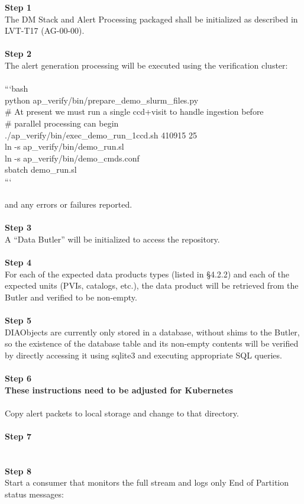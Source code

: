 \textbf{Step 1}\\
The DM Stack and Alert Processing packaged shall be initialized as
described in LVT-T17 (AG-00-00).\\
~\\
\textbf{Step 2}\\
The alert generation processing will be executed using the verification
cluster:\\
~\\
```bash\\
python ap\_verify/bin/prepare\_demo\_slurm\_files.py\\
\# At present we must run a single ccd+visit to handle ingestion
before\\
\# parallel processing can begin\\
./ap\_verify/bin/exec\_demo\_run\_1ccd.sh 410915 25\\
ln -s ap\_verify/bin/demo\_run.sl\\
ln -s ap\_verify/bin/demo\_cmds.conf\\
sbatch demo\_run.sl\\
```\\
~\\
and any errors or failures reported.\\
~\\
\textbf{Step 3}\\
A ``Data Butler'' will be initialized to access the repository.\\
~\\
\textbf{Step 4}\\
For each of the expected data products types (listed in §4.2.2) and each
of the expected units (PVIs, catalogs, etc.), the data product will be
retrieved from the Butler and verified to be non-empty.\\
~\\
\textbf{Step 5}\\
DIAObjects are currently only stored in a database, without shims to the
Butler, so the existence of the database table and its non-empty
contents will be verified by directly accessing it using sqlite3 and
executing appropriate SQL queries.\\
~\\
\textbf{Step 6}\\
\textbf{These instructions need to be adjusted for Kubernetes}\\
~\\
Copy alert packets to local storage and change to that directory.\\
~\\
\textbf{Step 7}\\
~\\
~\\
\textbf{Step 8}\\
Start a consumer that monitors the full stream and logs only End of
Partition status messages:\\
~\\

